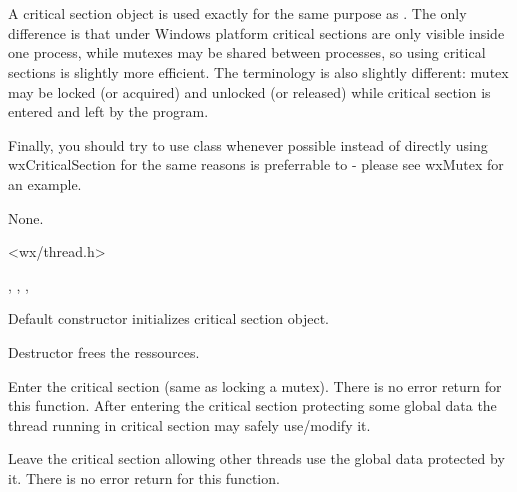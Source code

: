 \section{}\label{wxcriticalsection}

A critical section object is used exactly for the same purpose as 
. The only difference is that under Windows platform
critical sections are only visible inside one process, while mutexes may be
shared between processes, so using critical sections is slightly more
efficient. The terminology is also slightly different: mutex may be locked (or
acquired) and unlocked (or released) while critical section is entered and left
by the program.

Finally, you should try to use 
 class whenever
possible instead of directly using wxCriticalSection for the same reasons 
 is preferrable to 
 - please see wxMutex for an example.


None.


<wx/thread.h>


, , 
, 


\label{wxcriticalsectionctor}


Default constructor initializes critical section object.

\label{wxcriticalsectiondtor}


Destructor frees the ressources.

\label{wxcriticalsectionenter}


Enter the critical section (same as locking a mutex). There is no error return
for this function. After entering the critical section protecting some global
data the thread running in critical section may safely use/modify it.

\label{wxcriticalsectionleave}


Leave the critical section allowing other threads use the global data protected
by it. There is no error return for this function.

